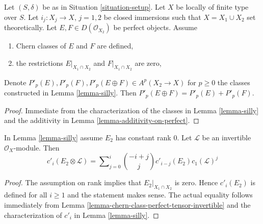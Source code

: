 \begin{lemma}
\label{lemma-silly-sum-P}
Let $(S, \delta)$ be as in Situation \ref{situation-setup}. Let $X$ be
locally of finite type over $S$. Let $i_j : X_j \to X$, $j = 1, 2$
be closed immersions such that $X = X_1 \cup X_2$ set theoretically. Let
$E, F \in D(\mathcal{O}_{X_2})$ be perfect objects. Assume
\begin{enumerate}
\item Chern classes of $E$ and $F$ are defined,
\item the restrictions $E|_{X_1 \cap X_2}$ and $F|_{X_1 \cap X_2}$ are zero,
\end{enumerate}
Denote $P'_p(E), P'_p(F), P'_p(E \oplus F) \in A^p(X_2 \to X)$ for $p \geq 0$
the classes constructed in Lemma \ref{lemma-silly}. Then
$P'_p(E \oplus F) = P'_p(E) + P'_p(F)$.
\end{lemma}

\begin{proof}
Immediate from the characterization of the classes in
Lemma \ref{lemma-silly} and the additivity in
Lemma \ref{lemma-additivity-on-perfect}.
\end{proof}

\begin{lemma}
\label{lemma-silly-tensor-invertible}
In Lemma \ref{lemma-silly} assume $E_2$ has constant rank $0$.
Let $\mathcal{L}$ be an invertible $\mathcal{O}_X$-module. Then
$$
c'_i(E_2 \otimes \mathcal{L}) =
\sum\nolimits_{j = 0}^i
\binom{- i + j}{j} c'_{i - j}(E_2) c_1(\mathcal{L})^j
$$
\end{lemma}

\begin{proof}
The assumption on rank implies that $E_2|_{X_1 \cap X_2}$ is zero.
Hence $c'_i(E_2)$ is defined for all $i \geq 1$ and the statement
makes sense. The actual equality follows
immediately from Lemma \ref{lemma-chern-class-perfect-tensor-invertible}
and the characterization of $c'_i$ in Lemma \ref{lemma-silly}.
\end{proof}

